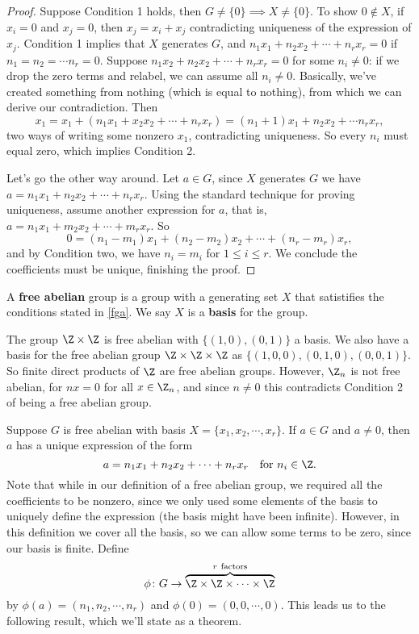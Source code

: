 \begin{proof}
    Suppose Condition 1 holds, then $G\neq \{0\} \implies X\neq \{0\}.$ To show $0\notin X$, if $x_i=0$ and $x_j=0$, then $x_j=x_i+x_j$ contradicting uniqueness of the expression of $x_j$. Condition 1 implies that $X$ generates $G$, and $n_1x_1+n_2x_2+\cdots+n_rx_r=0$ if $n_1=n_2=\cdots n_r=0$. Suppose $n_1x_2+n_2x_2+\cdots+n_rx_r=0$ for some $n_i\neq 0$: if we drop the zero terms and relabel, we can assume all $n_i\neq 0$. Basically, we've created something from nothing (which is equal to nothing), from which we can derive our contradiction. Then 
   \[
       x_1=x_1+(n_1x_1+x_2x_2+\cdots+n_rx_r)=(n_1+1)x_1+n_2x_2+\cdots n_rx_r,
   \] two ways of writing some nonzero $x_1$, contradicting uniqueness. So every $n_i$ must equal zero, which implies Condition 2.

   Let's go the other way around. Let $a\in G$, since $X$ generates $G$ we have $a=n_1x_1+n_2x_2+\cdots+n_rx_r$. Using the standard technique for proving uniqueness, assume another expression for $a $, that is, $a=n_1x_1+m_2x_2+\cdots+m_rx_r$. So \[
       0=(n_1-m_1)x_1+(n_2-m_2)x_2+\cdots+(n_r-m_r)x_r,
   \] and by Condition two, we have $n_i=m_i$ for $1\leq i \leq r$. We conclude the coefficients must be unique, finishing the proof.
\end{proof}
\begin{definition}
    A \textbf{free abelian} group is a group with a generating set $X$ that satistifies the conditions stated in \cref{fga}. We say $X$ is a \textbf{basis} for the group.
\end{definition}
\begin{example}
    The group $\Z\times \Z$ is free abelian with $\{(1,0),(0,1)\} $ a basis. We also have a basis for the free abelian group $\Z\times \Z\times \Z$ as $\{(1,0,0),(0,1,0),(0,0,1)\} $. So finite direct products of $\Z$ are free abelian groups. However, $\Z_n$ is not free abelian, for $nx=0$ for all $x\in \Z_n$, and since $n\neq 0$ this contradicts Condition 2 of being a free abelian group.
\end{example}
Suppose $G$ is free abelian with basis $X=\{x_1,x_2,\cdots,x_r\} $. If $a\in G$ and $a\neq 0$, then $a$ has a unique expression of the form \[
    a=n_1x_1+n_2x_2+\cdots+n_rx_r\quad \text{for} \ n_i\in \Z.
    \] Note that while in our definition of a free abelian group, we required all the coefficients to be nonzero, since we only used some elements of the basis to uniquely define the expression (the basis might have been infinite). However, in this definition we cover all the basis, so we can allow some terms to be zero, since our basis is finite. Define \[
\phi \colon G \to \overset{r \ \text{factors}}{\overbrace{\Z\times \Z\times \cdots \times \Z}}
\] by $\phi(a)=(n_1,n_2,\cdots,n_r)$ and $\phi(0)=(0,0,\cdots,0)$. This leads us to the following result, which we'll state as a theorem. 
